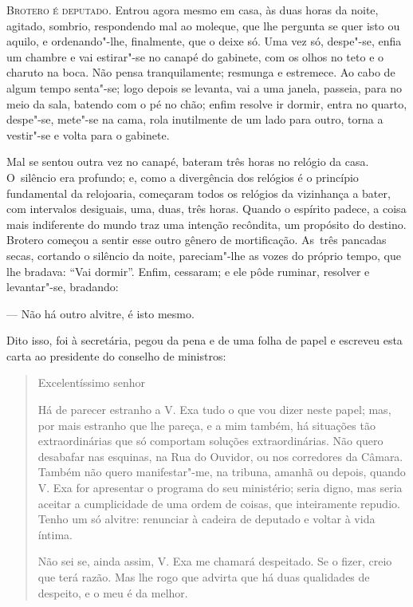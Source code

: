 \begin{linenumbers}

\textsc{Brotero é deputado}. Entrou agora mesmo em casa, às duas horas da noite,
agitado, sombrio, respondendo mal ao moleque, que lhe pergunta se quer
isto ou aquilo, e ordenando"-lhe, finalmente, que o deixe só. Uma vez só,
despe"-se, enfia um chambre e vai estirar"-se no canapé do gabinete, com
os olhos no teto e o charuto na boca. Não pensa tranquilamente; resmunga
e estremece. Ao cabo de algum tempo senta"-se; logo depois se levanta,
vai a uma janela, passeia, para no meio da sala, batendo com o pé no
chão; enfim resolve ir dormir, entra no quarto, despe"-se, mete"-se na
cama, rola inutilmente de um lado para outro, torna a vestir"-se e volta
para o gabinete.

Mal se sentou outra vez no canapé, bateram três horas no relógio da
casa. O~silêncio era profundo; e, como a divergência dos relógios é o
princípio fundamental da relojoaria, começaram todos os relógios da
vizinhança a bater, com intervalos desiguais, uma, duas, três horas.
Quando o espírito padece, a coisa mais indiferente do mundo traz uma
intenção recôndita, um propósito do destino. Brotero começou a sentir
esse outro gênero de mortificação. As~três pancadas secas, cortando o
silêncio da noite, pareciam"-lhe as vozes do próprio tempo, que lhe
bradava: ``Vai dormir''. Enfim, cessaram; e ele pôde ruminar, resolver e
levantar"-se, bradando:

--- Não há outro alvitre, é isto mesmo.

Dito isso, foi à secretária, pegou da pena e de uma folha de papel e
escreveu esta carta ao presidente do conselho de ministros:

\bigskip

\begin{quote}
Excelentíssimo senhor

Há de parecer estranho a V. Exa tudo o que vou dizer neste papel; mas,
por mais estranho que lhe pareça, e a mim também, há situações tão
extraordinárias que só comportam soluções extraordinárias. Não quero
desabafar nas esquinas, na Rua do Ouvidor, ou nos corredores da Câmara.
Também não quero manifestar"-me, na tribuna, amanhã ou depois, quando V.
Exa for apresentar o programa do seu ministério; seria digno, mas seria
aceitar a cumplicidade de uma ordem de coisas, que inteiramente repudio.
Tenho um só alvitre: renunciar à cadeira de deputado e voltar à vida
íntima.

Não sei se, ainda assim, V. Exa me chamará despeitado. Se o fizer, creio
que terá razão. Mas lhe rogo que advirta que há duas qualidades de
despeito, e o meu é da melhor.


\end{quote}
\end{linenumbers}
